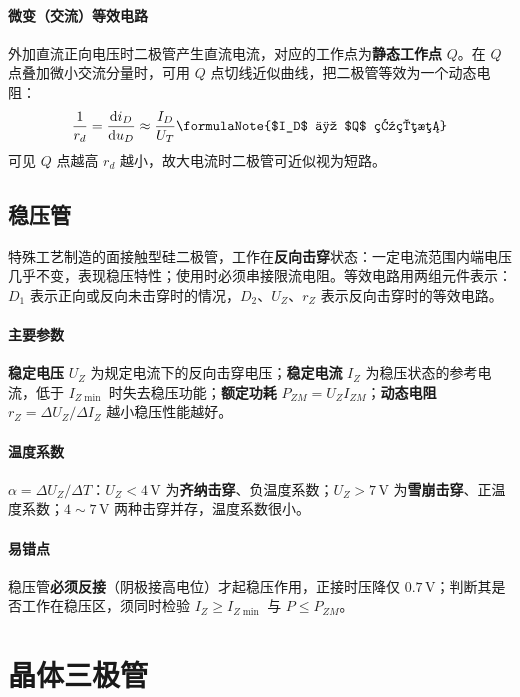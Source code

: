 \paragraph{微变（交流）等效电路} 外加直流正向电压时二极管产生直流电流，对应的工作点为\textbf{静态工作点} $Q$。在 $Q$ 点叠加微小交流分量时，可用 $Q$ 点切线近似曲线，把二极管等效为一个动态电阻：
\begin{equation}
\frac{1}{r_d} = \frac{\mathrm{d}i_D}{\mathrm{d}u_D}
\approx \frac{I_D}{U_T}
\formulaNote{$I_D$ 为 $Q$ 点电流}
\end{equation}
可见 $Q$ 点越高 $r_d$ 越小，故大电流时二极管可近似视为短路。

\subsection{稳压管}

特殊工艺制造的面接触型硅二极管，工作在\textbf{反向击穿}状态：一定电流范围内端电压几乎不变，表现稳压特性；使用时必须串接限流电阻。等效电路用两组元件表示：$D_1$ 表示正向或反向未击穿时的情况，$D_2$、$U_Z$、$r_Z$ 表示反向击穿时的等效电路。

\paragraph{主要参数} \textbf{稳定电压} $U_Z$ 为规定电流下的反向击穿电压；\textbf{稳定电流} $I_Z$ 为稳压状态的参考电流，低于 $I_{Z\min}$ 时失去稳压功能；\textbf{额定功耗} $P_{ZM}=U_Z I_{ZM}$；\textbf{动态电阻} $r_Z=\Delta U_Z/\Delta I_Z$ 越小稳压性能越好。

\paragraph{温度系数} $\alpha=\Delta U_Z/\Delta T$：$U_Z<4\,\text{V}$ 为\textbf{齐纳击穿}、负温度系数；$U_Z>7\,\text{V}$ 为\textbf{雪崩击穿}、正温度系数；$4\sim7\,\text{V}$ 两种击穿并存，温度系数很小。

\paragraph{易错点} 稳压管\textbf{必须反接}（阴极接高电位）才起稳压作用，正接时压降仅 $0.7\,\text{V}$；判断其是否工作在稳压区，须同时检验 $I_Z\ge I_{Z\min}$ 与 $P\le P_{ZM}$。

\section{晶体三极管}


